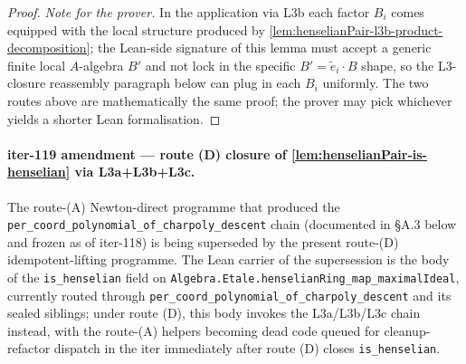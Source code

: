 \begin{proof}
\emph{Note for the prover.} In the application via L3b each
factor $B_i$ comes equipped with the local structure produced by
\cref{lem:henselianPair-l3b-product-decomposition}; the
Lean-side signature of this lemma must accept a generic finite
local $A$-algebra $B'$ and not lock in the specific
$B' = \tilde e_i \cdot B$ shape, so the L3-closure reassembly
paragraph below can plug in each $B_i$ uniformly. The two routes
above are mathematically the same proof; the prover may pick
whichever yields a shorter Lean formalisation.
\end{proof}

\paragraph{iter-119 amendment --- route (D) closure of
\cref{lem:henselianPair-is-henselian} via L3a+L3b+L3c.}
The route-(A) Newton-direct programme that produced the
\texttt{per\_coord\_polynomial\_of\_charpoly\_descent} chain
(documented in §A.3 below and frozen as of iter-118) is being
superseded by the present route-(D) idempotent-lifting programme.
The Lean carrier of the supersession is the body of the
\texttt{is\_henselian} field on
\texttt{Algebra.Etale.henselianRing\_map\_maximalIdeal}, currently
routed through
\texttt{per\_coord\_polynomial\_of\_charpoly\_descent} and its
sealed siblings; under route (D), this body invokes the L3a/L3b/L3c
chain instead, with the route-(A) helpers becoming dead code
queued for cleanup-refactor dispatch in the iter immediately
after route (D) closes \texttt{is\_henselian}.

